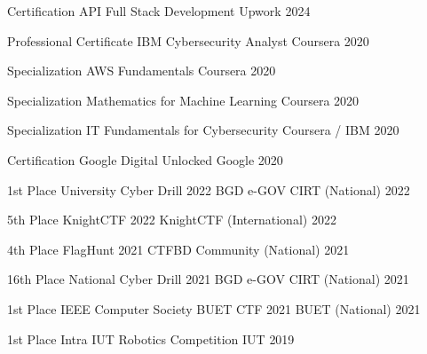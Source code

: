 


\begin{cvhonors}


  \cvhonor
    {Certification}
    {API Full Stack Development}
    {Upwork}
    {2024}

  \cvhonor
    {Professional Certificate}
    {IBM Cybersecurity Analyst}
    {Coursera}
    {2020}

  \cvhonor
    {Specialization}
    {AWS Fundamentals}
    {Coursera}
    {2020}

  \cvhonor
    {Specialization}
    {Mathematics for Machine Learning}
    {Coursera}
    {2020}

  \cvhonor
    {Specialization}
    {IT Fundamentals for Cybersecurity}
    {Coursera / IBM}
    {2020}

  \cvhonor
    {Certification}
    {Google Digital Unlocked}
    {Google}
    {2020}


  \cvhonor
    {1st Place}
    {University Cyber Drill 2022}
    {BGD e-GOV CIRT (National)}
    {2022}

  \cvhonor
    {5th Place}
    {KnightCTF 2022}
    {KnightCTF (International)}
    {2022}

  \cvhonor
    {4th Place}
    {FlagHunt 2021}
    {CTFBD Community (National)}
    {2021}

  \cvhonor
    {16th Place}
    {National Cyber Drill 2021}
    {BGD e-GOV CIRT (National)}
    {2021}

  \cvhonor
    {1st Place}
    {IEEE Computer Society BUET CTF 2021}
    {BUET (National)}
    {2021}

  \cvhonor
    {1st Place}
    {Intra IUT Robotics Competition}
    {IUT}
    {2019}

\end{cvhonors}
